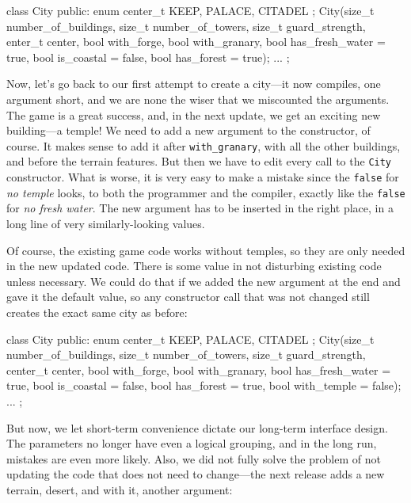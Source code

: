 \begin{code}
class City {
  public:
  enum center_t { KEEP, PALACE, CITADEL };
  City(size_t number_of_buildings,
       size_t number_of_towers,
       size_t guard_strength,
       enter_t center,
       bool with_forge,
       bool with_granary,
       bool has_fresh_water = true,
       bool is_coastal = false,
       bool has_forest = true);
  ...
};
\end{code}

Now, let's go back to our first attempt to create a city---it now compiles, one argument short, and we are none the wiser that we miscounted the arguments. The game is a great success, and, in the next update, we get an exciting new building---a temple! We need to add a new argument to the constructor, of course. It makes sense to add it after \texttt{with\_granary}, with all the other buildings, and before the terrain features. But then we have to edit every call to the \texttt{City} constructor. What is worse, it is very easy to make a mistake since the \texttt{false} for \emph{no temple} looks, to both the programmer and the compiler, exactly like the \texttt{false} for \emph{no fresh water}. The new argument has to be inserted in the right place, in a long line of very similarly-looking values.

Of course, the existing game code works without temples, so they are only needed in the new updated code. There is some value in not disturbing existing code unless necessary. We could do that if we added the new argument at the end and gave it the default value, so any constructor call that was not changed still creates the exact same city as before:

\begin{code}
class City {
  public:
  enum center_t { KEEP, PALACE, CITADEL };
  City(size_t number_of_buildings,
       size_t number_of_towers,
       size_t guard_strength,
       center_t center,
       bool with_forge,
       bool with_granary,
       bool has_fresh_water = true,
       bool is_coastal = false,
       bool has_forest = true,
       bool with_temple = false);
  ...
};
\end{code}

But now, we let short-term convenience dictate our long-term interface design. The parameters no longer have even a logical grouping, and in the long run, mistakes are even more likely. Also, we did not fully solve the problem of not updating the code that does not need to change---the next release adds a new terrain, desert, and with it, another argument:

